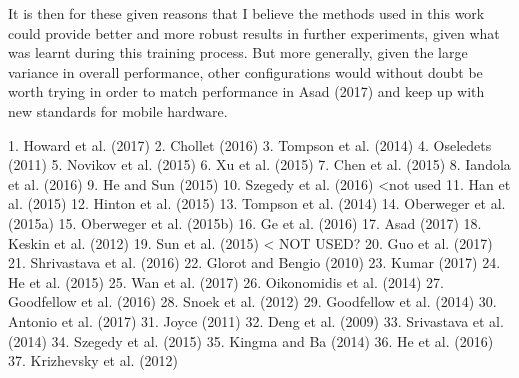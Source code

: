 \documentclass{article}
\begin{document}
{It is then for these given reasons that I believe the methods used in this work could provide better and more robust results in further experiments, given what was learnt during this training process. But more generally, given the large variance in overall performance, other configurations would without doubt be worth trying in order to match performance in Asad (2017) and keep up with new standards for mobile hardware.

1. Howard et al. (2017)
2. Chollet (2016)
3. Tompson et al. (2014)
4. Oseledets (2011)
5. Novikov et al. (2015)
6. Xu et al. (2015)
7. Chen et al. (2015)
8. Iandola et al. (2016)
9. He and Sun (2015)
10. Szegedy et al. (2016) <not used
11. Han et al. (2015)
12. Hinton et al. (2015)
13. Tompson et al. (2014)
14. Oberweger et al. (2015a)
15. Oberweger et al. (2015b)
16. Ge et al. (2016)
17. Asad (2017)
18. Keskin et al. (2012)
19. Sun et al. (2015) < NOT USED?
20. Guo et al. (2017)
21. Shrivastava et al. (2016)
22. Glorot and Bengio (2010)
23. Kumar (2017)
24. He et al. (2015)
25. Wan et al. (2017)
26. Oikonomidis et al. (2014)
27. Goodfellow et al. (2016)
28. Snoek et al. (2012)
29. Goodfellow et al. (2014)
30. Antonio et al. (2017)
31. Joyce (2011)
32. Deng et al. (2009)
33. Srivastava et al. (2014)
34. Szegedy et al. (2015)
35. Kingma and Ba (2014)
36. He et al. (2016)
37. Krizhevsky et al. (2012)


}
\end{document}
